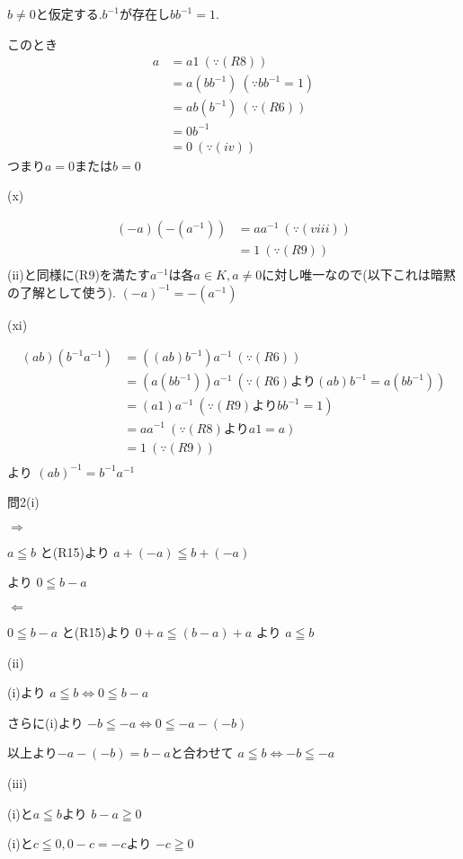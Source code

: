 \documentclass{jsarticle}
\begin{document}
$b\neq 0$と仮定する.$b^{-1}$が存在し$bb^{-1}=1$.


このとき
\begin{align*}
a &= a1 \ (\because (R8))\\
&= a(bb^{-1}) \ (\because bb^{-1}=1)\\
&= ab(b^{-1}) \ (\because (R6))\\
&= 0b^{-1}\\
&= 0 \ (\because (iv))
\end{align*}
つまり$a=0$または$b=0$

(x)

\begin{align*}
(-a)(-(a^{-1})) &= aa^{-1} \ (\because (viii))\\
&= 1 \ (\because (R9))\\
\end{align*}
(ii)と同様に(R9)を満たす$a^{-1}$は各$a\in K,a\neq 0$に対し唯一なので(以下これは暗黙の了解として使う).
$(-a)^{-1}=-(a^{-1})$

(xi)

\begin{align*}
(ab)(b^{-1}a^{-1})&=((ab)b^{-1})a^{-1} \ (\because (R6))\\
&=(a(bb^{-1}))a^{-1} \ (\because (R6) より(ab)b^{-1}=a(bb^{-1}))\\
&=(a1)a^{-1} \ (\because (R9) よりbb^{-1}=1)\\
&=aa^{-1} \ (\because (R8) よりa1=a)\\
&=1 \ (\because (R9))\\
\end{align*}
より
$(ab)^{-1}=b^{-1}a^{-1}$


問2(i)


$\Rightarrow$


$a\leqq b$
と(R15)より
$a+(-a)\leqq b+(-a)$

より
$0\leqq b-a$


$\Leftarrow$


$0\leqq b-a$
と(R15)より
$0+a\leqq (b-a)+a$
より
$a\leqq b$


(ii)


(i)より
$a\leqq b \Leftrightarrow 0\leqq b-a$

さらに(i)より
$-b\leqq -a \Leftrightarrow 0\leqq -a-(-b)$

以上より$-a-(-b)=b-a$と合わせて
$a\leqq b \Leftrightarrow -b\leqq -a$


(iii)


(i)と$a\leqq b$より
$b-a \geqq 0$

(i)と$c\leqq 0,0-c=-c$より
$-c\geqq 0$
\end{document}
